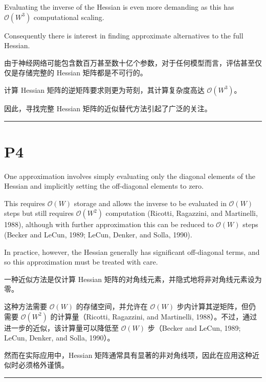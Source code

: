 \documentclass{article}
\begin{document}
Evaluating the inverse of the Hessian is even more demanding as this has $\mathcal{O}(W^3)$ computational scaling. 

Consequently there is interest in finding approximate alternatives to the full Hessian.

{\color{red}
由于神经网络可能包含数百万甚至数十亿个参数，对于任何模型而言，评估甚至仅仅是存储完整的 Hessian 矩阵都是不可行的。

计算 Hessian 矩阵的逆矩阵要求则更为苛刻，其计算复杂度高达 $\mathcal{O}(W^3)$。

因此，寻找完整 Hessian 矩阵的近似替代方法引起了广泛的关注。

}

\noindent\rule{\linewidth}{0.4pt}

\section{P4}

One approximation involves simply evaluating only the diagonal elements of the Hessian and implicitly setting the off-diagonal elements to zero. 

This requires $\mathcal{O}(W)$ storage and allows the inverse to be evaluated in $\mathcal{O}(W)$ steps but still requires $\mathcal{O}(W^2)$ computation (Ricotti, Ragazzini, and Martinelli, 1988), although with further approximation this can be reduced to $\mathcal{O}(W)$ steps (Becker and LeCun, 1989; LeCun, Denker, and Solla, 1990). 

In practice, however, the Hessian generally has significant off-diagonal terms, and so this approximation must be treated with care.

{\color{red}
一种近似方法是仅计算 Hessian 矩阵的对角线元素，并隐式地将非对角线元素设为零。

这种方法需要 $\mathcal{O}(W)$ 的存储空间，并允许在 $\mathcal{O}(W)$ 步内计算其逆矩阵，但仍需要 $\mathcal{O}(W^2)$ 的计算量（Ricotti, Ragazzini, and Martinelli, 1988）。不过，通过进一步的近似，该计算量可以降低至 $\mathcal{O}(W)$ 步（Becker and LeCun, 1989; LeCun, Denker, and Solla, 1990）。

然而在实际应用中，Hessian 矩阵通常具有显著的非对角线项，因此在应用这种近似时必须格外谨慎。

}

\noindent\rule{\linewidth}{0.4pt}
\end{document}
